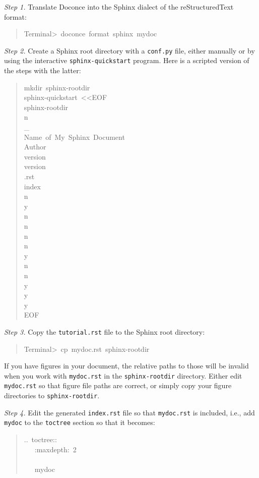 \documentclass[a4paper]{article}
\begin{document}
\emph{Step 1.} Translate Doconce into the Sphinx dialect of
the reStructuredText format:
%
\begin{quote}{\ttfamily \raggedright \noindent
Terminal>~doconce~format~sphinx~mydoc
}
\end{quote}

\emph{Step 2.} Create a Sphinx root directory with a \texttt{conf.py} file,
either manually or by using the interactive \texttt{sphinx-quickstart}
program. Here is a scripted version of the steps with the latter:
%
\begin{quote}{\ttfamily \raggedright \noindent
mkdir~sphinx-rootdir\\
sphinx-quickstart~<{}<EOF\\
sphinx-rootdir\\
n\\
\_\\
Name~of~My~Sphinx~Document\\
Author\\
version\\
version\\
.rst\\
index\\
n\\
y\\
n\\
n\\
n\\
n\\
y\\
n\\
n\\
y\\
y\\
y\\
EOF
}
\end{quote}

\emph{Step 3.} Copy the \texttt{tutorial.rst} file to the Sphinx root directory:
%
\begin{quote}{\ttfamily \raggedright \noindent
Terminal>~cp~mydoc.rst~sphinx-rootdir
}
\end{quote}

If you have figures in your document, the relative paths to those will
be invalid when you work with \texttt{mydoc.rst} in the \texttt{sphinx-rootdir}
directory. Either edit \texttt{mydoc.rst} so that figure file paths are correct,
or simply copy your figure directories to \texttt{sphinx-rootdir}.

\emph{Step 4.} Edit the generated \texttt{index.rst} file so that \texttt{mydoc.rst}
is included, i.e., add \texttt{mydoc} to the \texttt{toctree} section so that it becomes:
%
\begin{quote}{\ttfamily \raggedright \noindent
..~toctree::\\
~~~:maxdepth:~2\\
~\\
~~~mydoc
}
\end{quote}
\end{document}
